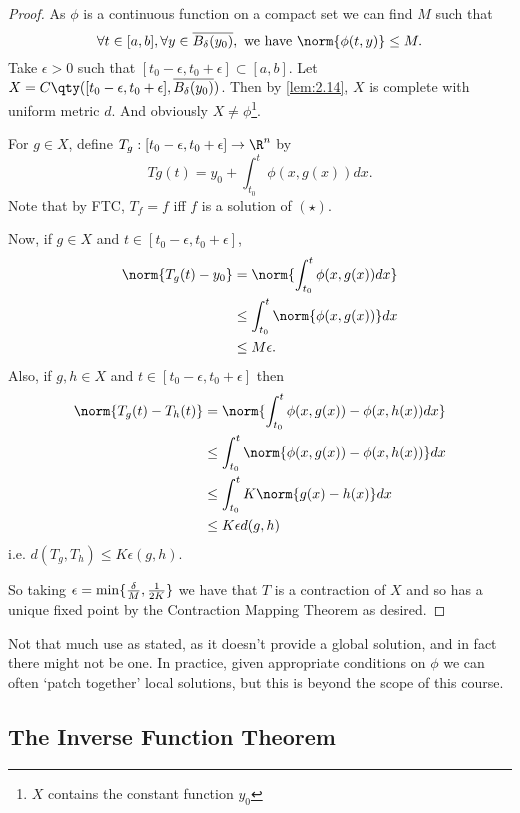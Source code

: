 \begin{proof}
    As $\phi$ is a continuous function on a compact set we can find $M$ such that \[\forall t\in [a,b], \forall y\in  \overline{B_\delta(y_0)}, \textup{ we have }\norm{\phi(t,y)}\leq M. \]
    Take $\epsilon > 0$ such that $[t_0-\epsilon, t_0+\epsilon]\subset [a,b]$.
    Let $X = C \qty( [t_0-\epsilon, t_0+\epsilon], \overline{B_\delta(y_0)} )$.
    Then by \cref{lem:2.14}, $X$ is complete with uniform metric $d$.
    And obviously $X\neq \phi$\footnote{$X$ contains the constant function $y_0$}.

    For $g\in X$, define $T_g:[t_0-\epsilon, t_0+\epsilon] \to \R^n$ by \[Tg(t) = y_0 + \int_{t_0}^t \phi(x,g(x)) dx. \]
    Note that by FTC, $T_f=f$ iff $f$ is a solution of $(\star)$.

    Now, if $g\in X$ and $t\in [t_0-\epsilon, t_0+\epsilon]$,
    \begin{align*}
        \norm{T_g(t) - y_0} &= \norm{\int_{t_0}^t \phi(x,g(x)) dx}\\
        &\leq \int_{t_0}^t \norm{\phi(x,g(x))} dx\\
        &\leq M\epsilon.
    \end{align*}
    Also, if $g,h\in X$ and $t\in [t_0-\epsilon, t_0+\epsilon] $ then
    \begin{align*}
        \norm{T_g(t) - T_h(t)} &= \norm{\int_{t_0}^t \phi(x,g(x)) - \phi(x,h(x)) dx}\\
        &\leq \int_{t_0}^t \norm{\phi(x,g(x)) - \phi(x,h(x))} dx\\
        &\leq \int_{t_0}^t K\norm{g(x) - h(x)} dx\\
        &\leq K\epsilon d(g,h)
    \end{align*}
    i.e. $d(T_g,T_h) \leq K \epsilon (g,h)$.

    So taking $\epsilon = \min\{\frac{\delta}{M}, \frac{1}{2K}\}$ we have that $T$ is a contraction of $X$ and so has a unique fixed point by the Contraction Mapping Theorem as desired.
\end{proof}

\begin{remark}
    Not that much use as stated, as it doesn't provide a global solution, and in fact there might not be one.
    In practice, given appropriate conditions on $\phi$ we can often `patch together' local solutions, but this is beyond the scope of this course.
\end{remark}

\subsection{The Inverse Function Theorem}

